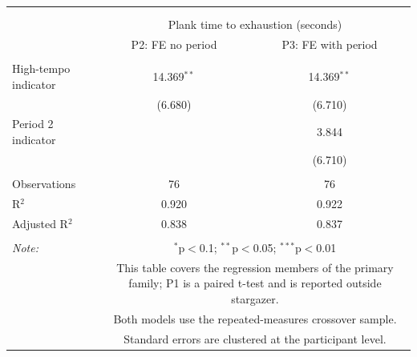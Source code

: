 
\begingroup 
\scriptsize 
\begin{tabular}{@{\extracolsep{3pt}}lcc} 
\\[-1.8ex]\hline 
\hline \\[-1.8ex] 
\\[-1.8ex] & \multicolumn{2}{c}{Plank time to exhaustion (seconds)} \\ 
 & P2: FE no period & P3: FE with period \\ 
\hline \\[-1.8ex] 
 High-tempo indicator & 14.369$^{**}$ & 14.369$^{**}$ \\ 
  & (6.680) & (6.710) \\ 
  Period 2 indicator &  & 3.844 \\ 
  &  & (6.710) \\ 
 \hline \\[-1.8ex] 
Observations & 76 & 76 \\ 
R$^{2}$ & 0.920 & 0.922 \\ 
Adjusted R$^{2}$ & 0.838 & 0.837 \\ 
\hline 
\hline \\[-1.8ex] 
\textit{Note:}  & \multicolumn{2}{p{0.82\textwidth}}{$^{*}$p$<$0.1; $^{**}$p$<$0.05; $^{***}$p$<$0.01} \\ 
 & \multicolumn{2}{p{0.82\textwidth}}{This table covers the regression members of the primary family; P1 is a paired t-test and is reported outside stargazer.} \\ 
 & \multicolumn{2}{p{0.82\textwidth}}{Both models use the repeated-measures crossover sample.} \\ 
 & \multicolumn{2}{p{0.82\textwidth}}{Standard errors are clustered at the participant level.} \\ 
\end{tabular} 
\endgroup 
